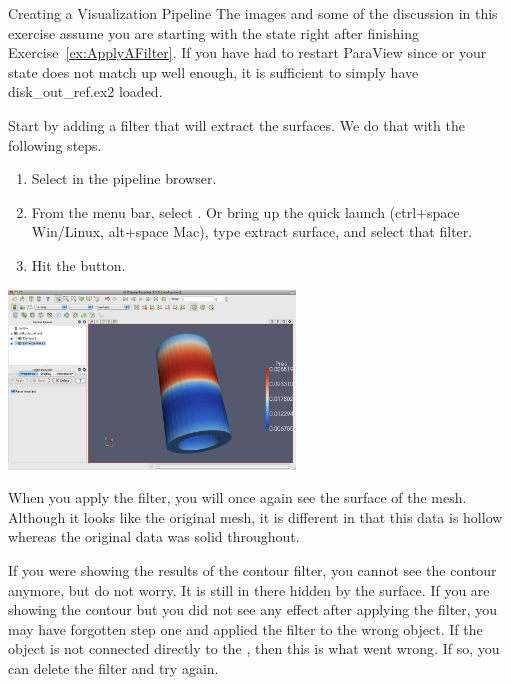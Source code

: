 \begin{exercise}{Creating a Visualization Pipeline}
  \label{ex:CreatingAVisualizationPipeline}%
  The images and some of the discussion in this exercise assume you are
  starting with the state right after finishing
  Exercise~\ref{ex:ApplyAFilter}.  If you have had to restart ParaView
  since or your state does not match up well enough, it is sufficient to
  simply have disk\_out\_ref.ex2 loaded.

  Start by adding a filter that will extract the surfaces.  We do that with
  the following steps.

  \begin{enumerate}
  \item Select  in the pipeline browser.
  \item From the menu bar, select  \ra {} \ra
    .  Or bring up the quick
    launch (ctrl+space Win/Linux, alt+space Mac), type extract surface, and
    select that filter.
  \item Hit the \apply button.
    \savecounter
  \end{enumerate}

  \begin{inlinefig}
    \includegraphics[width=3in]{images/CutSurface1}
  \end{inlinefig}

  When you apply the  filter, you will once again see
  the surface of the mesh.  Although it looks like the original mesh, it is
  different in that this data is hollow whereas the original data was solid
  throughout.

  If you were showing the results of the contour filter, you cannot see the
  contour anymore, but do not worry.  It is still in there hidden by the
  surface.  If you are showing the contour but you did not see any effect
  after applying the filter, you may have forgotten step one and applied
  the filter to the wrong object.  If the  object is
  not connected directly to the , then this is what
  went wrong.  If so, you can delete the filter and try again.


\end{exercise}
